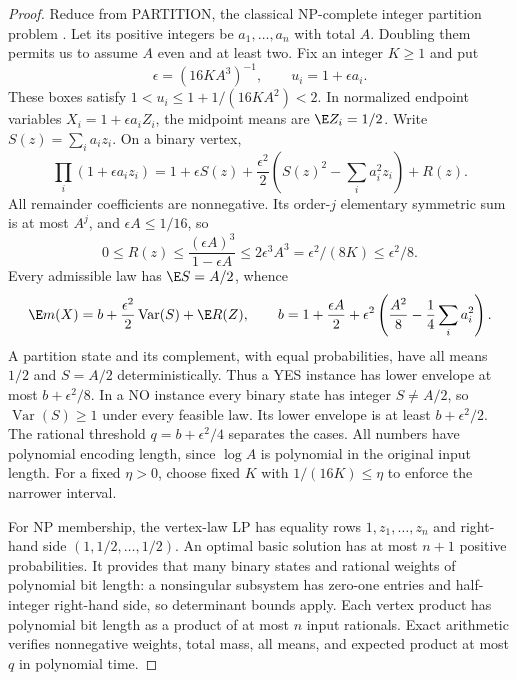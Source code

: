 \begin{proof}
Reduce from PARTITION, the classical NP-complete integer partition
problem \citep{Karp1972}. Let its positive integers be $a_1,\ldots,a_n$
with total $A$. Doubling them permits us to assume $A$ even and at least
two. Fix an integer $K\ge1$ and put
\[
 \epsilon=(16KA^3)^{-1},\qquad u_i=1+\epsilon a_i.
\]
These boxes satisfy $1<u_i\le1+1/(16KA^2)<2$.
In normalized endpoint variables $X_i=1+\epsilon a_iZ_i$, the midpoint
means are $\E Z_i=1/2$. Write $S(z)=\sum_i a_i z_i$. On a binary vertex,
\begin{equation}\label{eq:partition-expansion}
 \prod_i(1+\epsilon a_iz_i)
 =1+\epsilon S(z)+\frac{\epsilon^2}{2}
             \left(S(z)^2-\sum_i a_i^2z_i\right)+R(z).
\end{equation}
All remainder coefficients are nonnegative. Its order-$j$ elementary
symmetric sum is at most $A^j$, and $\epsilon A\le1/16$, so
\begin{equation}\label{eq:partition-remainder}
 0\le R(z)\le\frac{(\epsilon A)^3}{1-\epsilon A}
     \le2\epsilon^3A^3=\epsilon^2/(8K)\le\epsilon^2/8.
\end{equation}
Every admissible law has $\E S=A/2$, whence
\[
 \E m(X)=b+\frac{\epsilon^2}{2}\operatorname{Var}(S)+\E R(Z),
 \qquad b=1+\frac{\epsilon A}{2}
       +\epsilon^2\left(\frac{A^2}{8}-\frac14\sum_i a_i^2\right).
\]
A partition state and its complement, with equal probabilities, have
all means $1/2$ and $S=A/2$ deterministically. Thus a YES instance has
lower envelope at most $b+\epsilon^2/8$. In a NO instance every binary
state has integer $S\ne A/2$, so $\operatorname{Var}(S)\ge1$ under
every feasible law. Its lower envelope is at least $b+\epsilon^2/2$.
The rational threshold $q=b+\epsilon^2/4$ separates the cases.
All numbers have polynomial encoding length, since $\log A$ is
polynomial in the original input length. For a fixed $\eta>0$, choose
fixed $K$ with $1/(16K)\le\eta$ to enforce the narrower interval.

For NP membership, the vertex-law LP has equality rows
$1,z_1,\ldots,z_n$ and right-hand side $(1,1/2,\ldots,1/2)$.
An optimal basic solution has at most $n+1$ positive probabilities.
It provides that many binary states and rational weights of polynomial
bit length: a nonsingular subsystem has zero-one entries and
half-integer right-hand side, so determinant bounds apply. Each vertex
product has polynomial bit length as a product of at most $n$ input
rationals. Exact arithmetic verifies nonnegative weights, total mass,
all means, and expected product at most $q$ in polynomial time.
\end{proof}

